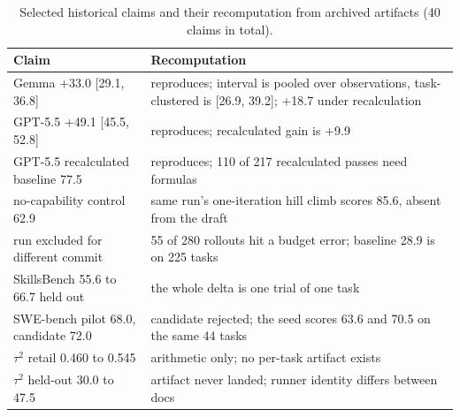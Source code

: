 \begin{table}[t]
\centering
\scriptsize
\caption{Selected historical claims and their recomputation from archived artifacts (40 claims in total).}
\label{tab:audit}
\begin{tabularx}{\columnwidth}{@{}p{0.9in}X@{}}
\toprule
Claim & Recomputation \\
\midrule
Gemma +33.0 [29.1, 36.8] & reproduces; interval is pooled over observations, task-clustered is [26.9, 39.2]; +18.7 under recalculation \\
GPT-5.5 +49.1 [45.5, 52.8] & reproduces; recalculated gain is +9.9 \\
GPT-5.5 recalculated baseline 77.5 & reproduces; 110 of 217 recalculated passes need formulas \\
no-capability control 62.9 & same run's one-iteration hill climb scores 85.6, absent from the draft \\
run excluded for different commit & 55 of 280 rollouts hit a budget error; baseline 28.9 is on 225 tasks \\
SkillsBench 55.6 to 66.7 held out & the whole delta is one trial of one task \\
SWE-bench pilot 68.0, candidate 72.0 & candidate rejected; the seed scores 63.6 and 70.5 on the same 44 tasks \\
$\tau^2$ retail 0.460 to 0.545 & arithmetic only; no per-task artifact exists \\
$\tau^2$ held-out 30.0 to 47.5 & artifact never landed; runner identity differs between docs \\
\bottomrule
\end{tabularx}
\end{table}
